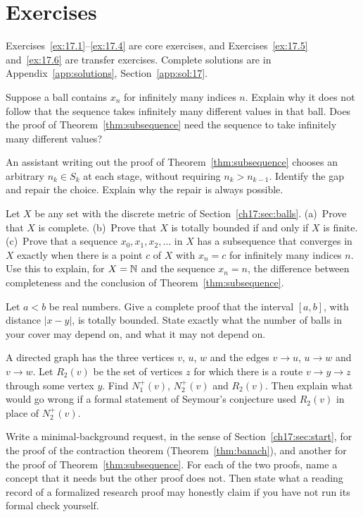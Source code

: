 \section*{Exercises}
Exercises~\ref{ex:17.1}--\ref{ex:17.4} are core exercises, and Exercises~\ref{ex:17.5} and~\ref{ex:17.6} are transfer exercises. Complete solutions are in Appendix~\ref{app:solutions}, Section~\ref{app:sol:17}.
\begin{exercise}\label{ex:17.1}Suppose a ball contains $x_n$ for infinitely many indices $n$. Explain why it does not follow that the sequence takes infinitely many different values in that ball. Does the proof of Theorem~\ref{thm:subsequence} need the sequence to take infinitely many different values?\end{exercise}
\begin{exercise}\label{ex:17.2}An assistant writing out the proof of Theorem~\ref{thm:subsequence} chooses an arbitrary $n_k\in S_k$ at each stage, without requiring $n_k>n_{k-1}$. Identify the gap and repair the choice. Explain why the repair is always possible.\end{exercise}
\begin{exercise}\label{ex:17.3}Let $X$ be any set with the discrete metric of Section~\ref{ch17:sec:balls}. (a)~Prove that $X$ is complete. (b)~Prove that $X$ is totally bounded if and only if $X$ is finite. (c)~Prove that a sequence $x_0,x_1,x_2,\ldots$ in $X$ has a subsequence that converges in $X$ exactly when there is a point $c$ of $X$ with $x_n=c$ for infinitely many indices $n$. Use this to explain, for $X=\mathbb N$ and the sequence $x_n=n$, the difference between completeness and the conclusion of Theorem~\ref{thm:subsequence}.\end{exercise}
\begin{exercise}\label{ex:17.4}Let $a<b$ be real numbers. Give a complete proof that the interval $[a,b]$, with distance $|x-y|$, is totally bounded. State exactly what the number of balls in your cover may depend on, and what it may not depend on.\end{exercise}
\begin{exercise}\label{ex:17.5}A directed graph has the three vertices $v$, $u$, $w$ and the edges $v\to u$, $u\to w$ and $v\to w$. Let $R_2(v)$ be the set of vertices $z$ for which there is a route $v\to y\to z$ through some vertex $y$. Find $N_1^+(v)$, $N_2^+(v)$ and $R_2(v)$. Then explain what would go wrong if a formal statement of Seymour's conjecture used $R_2(v)$ in place of $N_2^+(v)$.\end{exercise}
\begin{exercise}\label{ex:17.6}Write a minimal-background request, in the sense of Section~\ref{ch17:sec:start}, for the proof of the contraction theorem (Theorem~\ref{thm:banach}), and another for the proof of Theorem~\ref{thm:subsequence}. For each of the two proofs, name a concept that it needs but the other proof does not. Then state what a reading record of a formalized research proof may honestly claim if you have not run its formal check yourself.\end{exercise}
